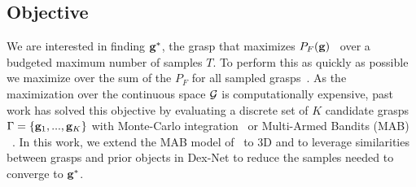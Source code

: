 \subsection{Objective}
We are interested in finding $\mathbf{g}^*$, the grasp that maximizes $P_F(\mathbf{g})$~\cite{kim2012physically, laskey2015bandits, mahler2015gp, weisz2012pose} over a budgeted maximum number of samples $T$.
To perform this as quickly as possible we maximize over the sum of the $P_F$ for all sampled grasps~\cite{laskey2015bandits, srinivas10gaussian}.
As the maximization over the continuous space $\mathcal{G}$ is computationally expensive, past work has solved this objective by evaluating a discrete set of $K$ candidate grasps $\Gamma = \left\{ \mathbf{g}_1, ..., \mathbf{g}_K \right\}$ with Monte-Carlo integration~\cite{kehoe2012toward, weisz2012pose} or Multi-Armed Bandits (MAB) ~\cite{laskey2015bandits}.
In this work, we extend the MAB model of~\cite{laskey2015bandits} to 3D and to leverage similarities between grasps and prior objects in Dex-Net to reduce the samples needed to converge to $\mathbf{g}^*$.